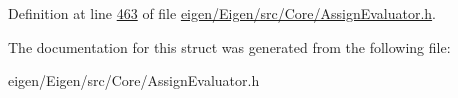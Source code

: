 Definition at line \hyperlink{eigen_2_eigen_2src_2_core_2_assign_evaluator_8h_source_l00463}{463} of file \hyperlink{eigen_2_eigen_2src_2_core_2_assign_evaluator_8h_source}{eigen/\+Eigen/src/\+Core/\+Assign\+Evaluator.\+h}.



The documentation for this struct was generated from the following file\+:\begin{DoxyCompactItemize}
\item 
eigen/\+Eigen/src/\+Core/\+Assign\+Evaluator.\+h\end{DoxyCompactItemize}
